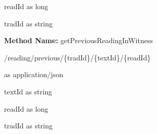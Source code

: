 \begin{parameter}
readId as long
\end{parameter}
\begin{parameter}
tradId as string
\end{parameter}
\textbf{Method Name: }getPreviousReadingInWitness
\begin{get}
/reading/previous/\{tradId\}/\{textId\}/\{readId\}
\end{get}
\begin{response}
 as application/json
\end{response}
\begin{parameter}
textId as string
\end{parameter}
\begin{parameter}
readId as long
\end{parameter}
\begin{parameter}
tradId as string
\end{parameter}
